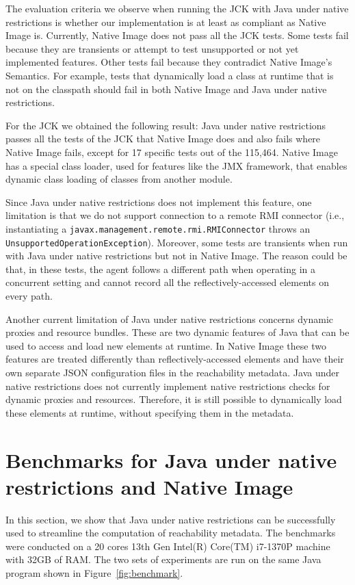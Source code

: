 The evaluation criteria we observe when running the JCK with Java under native restrictions is whether our implementation is at least as compliant as Native Image is. Currently, Native Image does not pass all the JCK tests. Some tests fail because they are transients or attempt to test unsupported or not yet implemented features. Other tests fail because they contradict Native Image's Semantics. For example, tests that dynamically load a class at runtime that is not on the classpath should fail in both Native Image and Java under native restrictions. 

For the JCK we obtained the following result: Java under native restrictions passes all the tests of the JCK that Native Image does and also fails where Native Image fails, except for 17 specific tests out of the 115,464. Native Image has a special class loader, used for features like the JMX framework, that enables dynamic class loading of classes from another module. 

Since Java under native restrictions does not implement this feature, one limitation is that we do not support connection to a remote RMI connector (i.e., instantiating a \verb|javax.management.remote.rmi.RMIConnector| throws an \verb|UnsupportedOperationException|). 
Moreover, some tests are transients when run with Java under native restrictions but not in Native Image. The reason could be that, in these tests, the agent follows a different path when operating in a concurrent setting and cannot record all the reflectively-accessed elements on every path. 

Another current limitation of Java under native restrictions concerns dynamic proxies and resource bundles. These are two dynamic features of Java that can be used to access and load new elements at runtime. In Native Image these two features are treated differently than reflectively-accessed elements and have their own separate JSON configuration files in the reachability metadata. Java under native restrictions does not currently implement native restrictions checks for dynamic proxies and resources. Therefore, it is still possible to dynamically load these elements at runtime, without specifying them in the metadata. 

\section{Benchmarks for Java under native restrictions and Native Image}\label{benchmark}
In this section, we show that Java under native restrictions can be successfully used to streamline the computation of reachability metadata. The benchmarks were conducted on a 20 cores 13th Gen Intel(R) Core(TM) i7-1370P machine with 32GB of RAM. The two sets of experiments are run on the same Java program shown in Figure~\ref{fig:benchmark}. 

